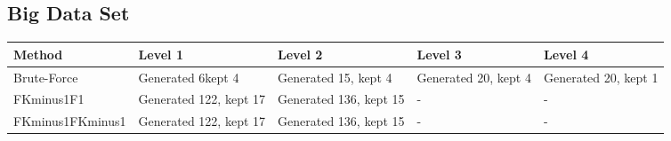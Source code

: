	\subsection{Big Data Set}
	\begin{table}[H]
		\begin{tabular}{| p{3.5cm} | p{2.5cm} | p{2.5cm} | p{2.5cm} | p{2.5cm} | }
			\hline
			Method & Level 1 & Level 2 & Level 3 & Level 4 \\ \hline
			Brute-Force & Generated 6kept 4 & Generated 15, kept 4 & Generated 20, kept 4 & Generated 20, kept 1 \\ \hline
			FKminus1F1 & Generated 122, kept 17 & Generated 136, kept 15 & - & - \\ \hline
			FKminus1FKminus1 & Generated 122, kept 17 & Generated 136, kept 15 & - & - \\ \hline
		\end{tabular}
	\end{table}



